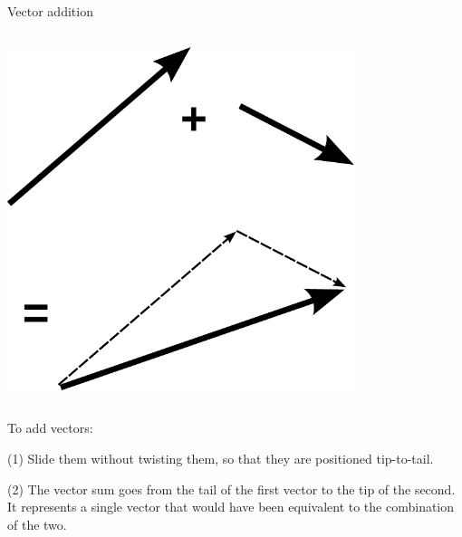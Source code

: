 \begin{frame}{Vector addition}


  \begin{mycolumns}

    \begin{column}{.4\textwidth}\includegraphics[width=4in]{ch04/figs/vector-addition}\end{column}

    \begin{column}{.6\textwidth}

      To add vectors:

      (1) Slide them without twisting them, so that they are positioned tip-to-tail.

      (2) The vector sum goes from the tail of the first vector to the tip of the second. It represents
      a single vector that would have been equivalent to the combination of the two.

    \end{column}
  \end{mycolumns}

\end{frame}

